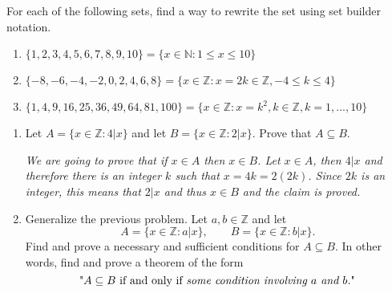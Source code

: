 \documentclass[11pt]{preprint}
\def\enumb{\begin{enumerate}}
\def\integers{\mathbb{Z}}
\begin{document}

\item For each of the following sets, find a way to rewrite the set using set builder notation.
\begin{enumerate}
\item $\{1,2,3,4,5,6,7,8,9,10\}=\{x\in\mathbb{N}: 1\leq x\leq 10\}$
\item $\{-8,-6,-4,-2,0,2,4,6,8\}=\{x\in \mathbb{Z}: x=2k\in\mathbb{Z}, -4\leq k\leq 4\}$
\item $\{1,4,9,16,25,36,49,64,81,100\}=\{x\in \mathbb{Z}: x=k^2, k\in\mathbb{Z}, k=1,...,10\}$
\end{enumerate}



\item
\enumb
\item Let $A=\{x\in\mathbb{Z}:4|x\}$ and let $B=\{x\in\integers:2|x\}$.  Prove that $A\subseteq B$.

\vspace{0.2cm}
\textit{We are going to prove that if $x\in A$ then $x\in B$. Let $x\in A$, then $4|x$ and therefore there is an integer $k$ such that $x=4k=2(2k)$. Since $2k$ is an integer, this means that $2|x$ and thus $x\in B$ and the claim is proved.}
\vspace{0.2cm}

\item Generalize the previous problem. Let $a,b\in\integers$ and let
\[
A=\{x\in\integers:a|x\},\qquad B=\{x\in\integers: b|x\}.
\]
Find and prove a necessary and sufficient conditions for $A\subseteq B$. In other words, find and prove a theorem of the form
\[
\textrm{"$A\subseteq B$ if and only if \textit{some condition involving $a$ and $b$.}"}
\]


\end{enumerate}
\end{document}
